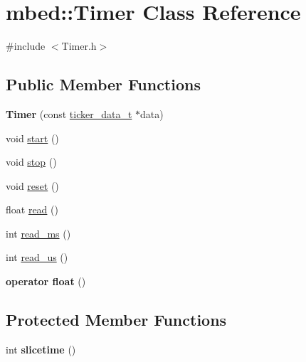 \hypertarget{classmbed_1_1Timer}{}\section{mbed\+:\+:Timer Class Reference}
\label{classmbed_1_1Timer}


{\ttfamily \#include $<$Timer.\+h$>$}

\subsection*{Public Member Functions}
\begin{DoxyCompactItemize}
\item 
{\bfseries Timer} (const \hyperlink{structticker__data__t}{ticker\+\_\+data\+\_\+t} $\ast$data)\hypertarget{classmbed_1_1Timer_aa660af6717dea877c88df8c3b9444de7}{}\label{classmbed_1_1Timer_aa660af6717dea877c88df8c3b9444de7}

\item 
void \hyperlink{classmbed_1_1Timer_aa9e4096c9e6a416f42e0ae3a85604caa}{start} ()
\item 
void \hyperlink{classmbed_1_1Timer_a4a687e8a871c6fd29d4b74bdef3c52a2}{stop} ()
\item 
void \hyperlink{classmbed_1_1Timer_a6b7f2334eb9533efb72fc29314f4fa02}{reset} ()
\item 
float \hyperlink{classmbed_1_1Timer_a121d69d1b058f0ac809dea2df5143bfc}{read} ()
\item 
int \hyperlink{classmbed_1_1Timer_a2bc063758527437192a555b35ca73d6c}{read\+\_\+ms} ()
\item 
int \hyperlink{classmbed_1_1Timer_a97735f708d71171d2905df675dc64091}{read\+\_\+us} ()
\item 
{\bfseries operator float} ()\hypertarget{classmbed_1_1Timer_a10b28607779c2ef84f880577fe13209f}{}\label{classmbed_1_1Timer_a10b28607779c2ef84f880577fe13209f}

\end{DoxyCompactItemize}
\subsection*{Protected Member Functions}
\begin{DoxyCompactItemize}
\item 
int {\bfseries slicetime} ()\hypertarget{classmbed_1_1Timer_aed61c2655fe5ac72eb0231e4e2bdb480}{}\label{classmbed_1_1Timer_aed61c2655fe5ac72eb0231e4e2bdb480}

\end{DoxyCompactItemize}
